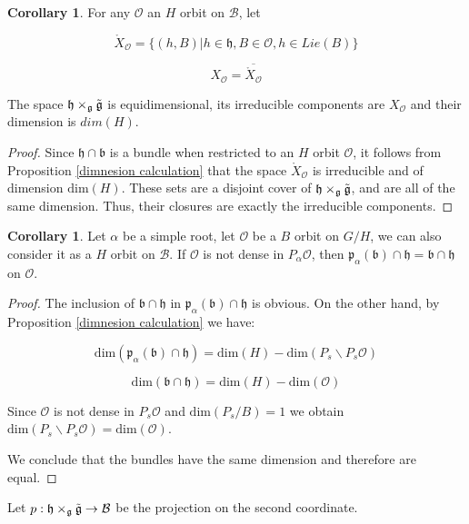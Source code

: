 \documentclass[12pt]{article}
\renewcommand{\rm}[1]{\mathrm{#1}}
\newcommand{\B}{\mathcal{B}}
\newcommand{\s}{\mathcal{O}}
\theoremstyle{plain}
\theoremstyle{definition}
\newtheorem{Cor}[theorem]{Corollary}
\begin{document}
\begin{Cor}\label{cor: irreducible components}
     For any $\s$ an $H$ orbit on $\B$, let 

        $$ \mathring{X}_{\mathcal{O}}=\{(h,B)|h\in \mathfrak{h}, B\in \s, h\in Lie(B)\}$$
     
    $$ X_{\mathcal{O}}=\overline{\mathring{X}_\s}$$

    The space $\mathfrak{h}\times_{\mathfrak{g}}\Tilde{\mathfrak{g}}$ is equidimensional, its irreducible components are $X_\s$ and their dimension is $dim(H)$.

\end{Cor}
\begin{proof}
    Since $\mathfrak{h}\cap\mathfrak{b}$ is a bundle when restricted to an $H$ orbit $\mathcal{O}$, it follows from Proposition \ref{dimnesion calculation} that the space $\mathring{X}_\s$ is irreducible and of dimension $\mathrm{dim}(H)$. These sets are a disjoint cover of $\mathfrak{h}\times_{\mathfrak{g}}\Tilde{\mathfrak{g}}$, and are all of the same dimension. Thus, their closures are exactly the irreducible components.
\end{proof}
\begin{Cor}\label{cor: non dense}
    Let $\alpha$ be a simple root, let $\s$ be a $B$ orbit on $G/H$, we can also consider it as a $H$ orbit on $\B$. If $\mathcal{O}$ is not dense in $P_{\alpha}\mathcal{O}$, then $\mathfrak{p}_{\alpha}(\mathfrak{b})\cap \mathfrak{h} =\mathfrak{b} \cap \mathfrak{h}$ on $\s$.
\end{Cor}
\begin{proof}
    The inclusion of $\mathfrak{b} \cap \mathfrak{h}$ in $\mathfrak{p}_{\alpha}(\mathfrak{b})\cap \mathfrak{h}$ is obvious. On the other hand, by Proposition \ref{dimnesion calculation} we have:

    $$ \rm{dim}(\mathfrak{p}_{\alpha}(\mathfrak{b})\cap \mathfrak{h})=\rm{dim}(H)-\rm{dim}(P_s\backslash P_{s}\mathcal{O})$$

    $$ \rm{dim}(\mathfrak{b}\cap \mathfrak{h})=\rm{dim}(H)-\rm{dim}(\mathcal{O})$$

    Since $\mathcal{O}$ is not dense in $P_{s}\mathcal{O}$ and $\mathrm{dim}(P_{s}/B)=1$ we obtain $\rm{dim}(P_s\backslash P_{s}\mathcal{O})=\rm{dim}(\mathcal{O})$. 

    We conclude that the bundles have the same dimension and therefore are equal.

\end{proof}

Let $p:\mathfrak{h}\times_{\mathfrak{g}}\Tilde{\mathfrak{g}}\rightarrow\B$ be the projection on the second coordinate.
\end{document}
